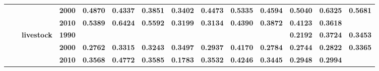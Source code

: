 \documentclass[
  authoryear,
  preprint,
  3p]{elsarticle}
\begin{document}
\begin{landscape}
\begin{longtable}[t]{>{}l>{}l>{}l>{}l>{}r>{}r>{}r>{}r>{}r>{}r>{}r>{}r>{}r>{}r}
\addlinespace
\textbf{} & \textbf{} & \textbf{} & \textbf{2000} & \textcolor[HTML]{4285f4}{\textbf{0.4870}} & \textcolor[HTML]{4285f4}{\textbf{0.4337}} & \textcolor[HTML]{4285f4}{\textbf{0.3851}} & \textcolor[HTML]{4285f4}{\textbf{0.3402}} & \textcolor[HTML]{4285f4}{\textbf{0.4473}} & \textcolor[HTML]{4285f4}{\textbf{0.5335}} & \textcolor[HTML]{4285f4}{\textbf{0.4594}} & \textcolor[HTML]{4285f4}{\textbf{0.5040}} & \textcolor[HTML]{4285f4}{\textbf{0.6325}} & \textcolor[HTML]{4285f4}{\textbf{0.5681}}\\
\textbf{} & \textbf{} & \textbf{} & \textbf{2010} & \textcolor[HTML]{4285f4}{\textbf{0.5389}} & \textcolor[HTML]{4285f4}{\textbf{0.6424}} & \textcolor[HTML]{4285f4}{\textbf{0.5592}} & \textcolor[HTML]{4285f4}{\textbf{0.3199}} & \textcolor[HTML]{4285f4}{\textbf{0.3134}} & \textcolor[HTML]{4285f4}{\textbf{0.4390}} & \textcolor[HTML]{4285f4}{\textbf{0.3872}} & \textcolor[HTML]{4285f4}{\textbf{0.4123}} & \textcolor[HTML]{4285f4}{\textbf{0.3618}} & \textcolor[HTML]{4285f4}{\textbf{}}\\
\textbf{} & \textbf{} & \textbf{livestock} & \textbf{1990} & \textcolor[HTML]{4285f4}{\textbf{}} & \textcolor[HTML]{4285f4}{\textbf{}} & \textcolor[HTML]{4285f4}{\textbf{}} & \textcolor[HTML]{4285f4}{\textbf{}} & \textcolor[HTML]{4285f4}{\textbf{}} & \textcolor[HTML]{4285f4}{\textbf{}} & \textcolor[HTML]{4285f4}{\textbf{}} & \textcolor[HTML]{4285f4}{\textbf{0.2192}} & \textcolor[HTML]{4285f4}{\textbf{0.3724}} & \textcolor[HTML]{4285f4}{\textbf{0.3453}}\\
\textbf{} & \textbf{} & \textbf{} & \textbf{2000} & \textcolor[HTML]{4285f4}{\textbf{0.2762}} & \textcolor[HTML]{4285f4}{\textbf{0.3315}} & \textcolor[HTML]{4285f4}{\textbf{0.3243}} & \textcolor[HTML]{4285f4}{\textbf{0.3497}} & \textcolor[HTML]{4285f4}{\textbf{0.2937}} & \textcolor[HTML]{4285f4}{\textbf{0.4170}} & \textcolor[HTML]{4285f4}{\textbf{0.2784}} & \textcolor[HTML]{4285f4}{\textbf{0.2744}} & \textcolor[HTML]{4285f4}{\textbf{0.2822}} & \textcolor[HTML]{4285f4}{\textbf{0.3365}}\\
\textbf{} & \textbf{} & \textbf{} & \textbf{2010} & \textcolor[HTML]{4285f4}{\textbf{0.3568}} & \textcolor[HTML]{4285f4}{\textbf{0.4772}} & \textcolor[HTML]{4285f4}{\textbf{0.3585}} & \textcolor[HTML]{4285f4}{\textbf{0.1783}} & \textcolor[HTML]{4285f4}{\textbf{0.3532}} & \textcolor[HTML]{4285f4}{\textbf{0.4246}} & \textcolor[HTML]{4285f4}{\textbf{0.3445}} & \textcolor[HTML]{4285f4}{\textbf{0.2948}} & \textcolor[HTML]{4285f4}{\textbf{0.2994}} & \textcolor[HTML]{4285f4}{\textbf{}}\\

\end{longtable}
\end{landscape}
\end{document}
